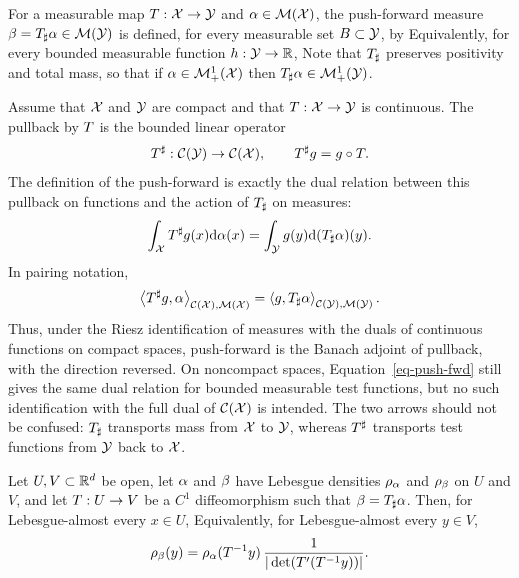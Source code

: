 \begin{defn}\label{defn-pushfwd}
For a measurable map $T : \mathcal{X} \rightarrow \mathcal{Y}$ and $\alpha \in \mathcal{M}(\mathcal{X})$, the push-forward measure $\beta = T_\sharp \alpha \in \mathcal{M}(\mathcal{Y})$ is defined, for every measurable set $B\subset\mathcal{Y}$, by
Equivalently, for every bounded measurable function $h:\mathcal{Y}\to\mathbb{R}$,
Note that $T_\sharp$ preserves positivity and total mass, so that if $\alpha \in \mathcal{M}_+^1(\mathcal{X})$ then $T_\sharp \alpha \in \mathcal{M}_+^1(\mathcal{Y})$.
\end{defn}


\begin{rem}\label{rem-pullback-pushforward}\label{rem-push-forward-pull-back}
	Assume that $\mathcal{X}$ and $\mathcal{Y}$ are compact and that $T:\mathcal{X}\to\mathcal{Y}$ is continuous. The pullback by $T$ is the bounded linear operator
	\[
		T^\sharp:\mathcal{C}(\mathcal{Y})\to\mathcal{C}(\mathcal{X}),
		\qquad
		T^\sharp g=g\circ T.
	\]
	The definition of the push-forward is exactly the dual relation between this pullback on functions and the action of $T_\sharp$ on measures:
	\[
		\int_{\mathcal{X}} T^\sharp g(x)\mathrm{d}\alpha(x)
		=
		\int_{\mathcal{Y}} g(y)\mathrm{d}(T_\sharp\alpha)(y).
	\]
	In pairing notation,
	\[
		\left\langle T^\sharp g,\alpha\right\rangle_{\mathcal{C}(\mathcal{X}),\mathcal{M}(\mathcal{X})}
		=
		\left\langle g,T_\sharp\alpha\right\rangle_{\mathcal{C}(\mathcal{Y}),\mathcal{M}(\mathcal{Y})}.
	\]
	Thus, under the Riesz identification of measures with the duals of continuous functions on compact spaces, push-forward is the Banach adjoint of pullback, with the direction reversed. On noncompact spaces, Equation~\eqref{eq-push-fwd} still gives the same dual relation for bounded measurable test functions, but no such identification with the full dual of $\mathcal{C}(\mathcal{X})$ is intended. The two arrows should not be confused: $T_\sharp$ transports mass from $\mathcal{X}$ to $\mathcal{Y}$, whereas $T^\sharp$ transports test functions from $\mathcal{Y}$ back to $\mathcal{X}$.
\end{rem}


\begin{prop}\label{prop-push-forward-densities}
	Let $U,V\subset\mathbb{R}^d$ be open, let $\alpha$ and $\beta$ have Lebesgue densities $\rho_{\alpha}$ and $\rho_{\beta}$ on $U$ and $V$, and let $T:U\to V$ be a $C^1$ diffeomorphism such that $\beta=T_\sharp\alpha$. Then, for Lebesgue-almost every $x\in U$,
	Equivalently, for Lebesgue-almost every $y\in V$,
	\[
		\rho_{\beta}(y)=\rho_{\alpha}(T^{-1}y)\,
		\frac{1}{|\det(T'(T^{-1}y))|}.
	\]
\end{prop}


